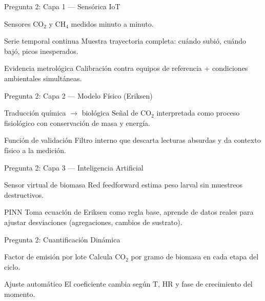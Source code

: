\documentclass[aspectratio=169, 11pt]{beamer}
\newcommand{\NDIR}{\text{NDIR}}
\begin{document}
\begin{frame}{Pregunta 2: Capa 1 --- Sensórica IoT}
\begin{block}{Sensores \NDIR}
\footnotesize
CO$_2$ y CH$_4$ medidos minuto a minuto.
\end{block}
\begin{exampleblock}{Serie temporal continua}
\footnotesize
Muestra trayectoria completa: cuándo subió, cuándo bajó, picos inesperados.
\end{exampleblock}
\begin{block}{Evidencia metrológica}
\footnotesize
Calibración contra equipos de referencia + condiciones ambientales simultáneas.
\end{block}
\end{frame}

\begin{frame}{Pregunta 2: Capa 2 --- Modelo Físico (Eriksen)}
\begin{block}{Traducción química $\rightarrow$ biológica}
\footnotesize
Señal de CO$_2$ interpretada como proceso fisiológico con conservación de masa y energía.
\end{block}
\begin{exampleblock}{Función de validación}
\footnotesize
Filtro interno que descarta lecturas absurdas y da contexto físico a la medición.
\end{exampleblock}
\end{frame}

\begin{frame}{Pregunta 2: Capa 3 --- Inteligencia Artificial}
\begin{block}{Sensor virtual de biomasa}
\footnotesize
Red feedforward estima peso larval sin muestreos destructivos.
\end{block}
\begin{exampleblock}{PINN}
\footnotesize
Toma ecuación de Eriksen como regla base, aprende de datos reales para ajustar desviaciones (agregaciones, cambios de sustrato).
\end{exampleblock}
\end{frame}

\begin{frame}{Pregunta 2: Cuantificación Dinámica}
\begin{block}{Factor de emisión por lote}
\footnotesize
Calcula CO$_2$ por gramo de biomasa en cada etapa del ciclo.
\end{block}
\begin{exampleblock}{Ajuste automático}
\footnotesize
El coeficiente cambia según T, HR y fase de crecimiento del momento.
\end{exampleblock}
\end{frame}
\end{document}
